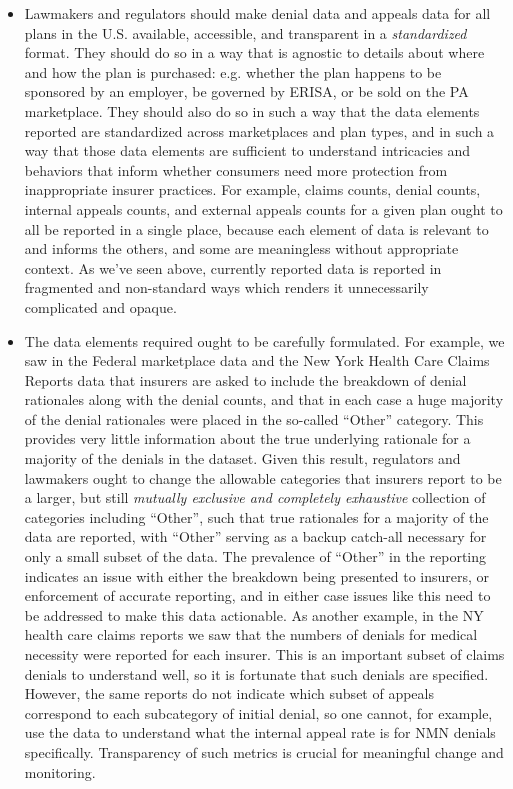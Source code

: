 \documentclass[12pt, a4paper,twoside,parskip=full]{report}
\theoremstyle{plain} %
\theoremstyle{definition} %
\theoremstyle{remark} %
\numberwithin{equation}{chapter}
\begin{document}
		\begin{itemize}
			\item Lawmakers and regulators should make denial data and appeals data for all plans in the U.S. available, accessible, and transparent in a \emph{standardized} format. They should do so in a way that is agnostic to details about where and how the plan is purchased: e.g. whether the plan happens to be sponsored by an employer, be governed by ERISA, or be sold on the PA marketplace. They should also do so in such a way that the data elements reported are standardized across marketplaces and plan types, and in such a way that those data elements are sufficient to understand intricacies and behaviors that inform whether consumers need more protection from inappropriate insurer practices. For example, claims counts, denial counts, internal appeals counts, and external appeals counts for a given plan ought to all be reported in a single place, because each element of data is relevant to and informs the others, and some are meaningless without appropriate context. As we've seen above, currently reported data is reported in fragmented and non-standard ways which renders it unnecessarily complicated and opaque.
			
			\item The data elements required ought to be carefully formulated. For example, we saw in the Federal marketplace data and the New York Health Care Claims Reports data that insurers are asked to include the breakdown of denial rationales along with the denial counts, and that in each case a huge majority of the denial rationales were placed in the so-called ``Other'' category. This provides very little information about the true underlying rationale for a majority of the denials in the dataset. Given this result, regulators and lawmakers ought to change the allowable categories that insurers report to be a larger, but still \emph{mutually exclusive and completely exhaustive} collection of categories including ``Other'', such that true rationales for a majority of the data are reported, with ``Other'' serving as a backup catch-all necessary for only a small subset of the data. The prevalence of ``Other'' in the reporting indicates an issue with either the breakdown being presented to insurers, or enforcement of accurate reporting, and in either case issues like this need to be addressed to make this data actionable. As another example, in the NY health care claims reports we saw that the numbers of denials for medical necessity were reported for each insurer. This is an important subset of claims denials to understand well, so it is fortunate that such denials are specified. However, the same reports do not indicate which subset of appeals correspond to each subcategory of initial denial, so one cannot, for example, use the data to understand what the internal appeal rate is for NMN denials specifically. Transparency of such metrics is crucial for meaningful change and monitoring.
			

\end{itemize}
\end{document}

